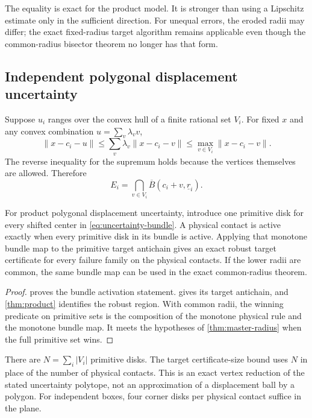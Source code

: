 The equality is exact for the product model. It is stronger than using a Lipschitz estimate only in the sufficient direction. For unequal errors, the eroded radii may differ; the exact fixed-radius target algorithm remains applicable even though the common-radius bisector theorem no longer has that form.

\subsection{Independent polygonal displacement uncertainty}
Suppose $u_i$ ranges over the convex hull of a finite rational set $V_i$. For fixed $x$ and any convex combination $u=\sum_v\lambda_v v$,
\[
\|x-c_i-u\|\le\sum_v\lambda_v\|x-c_i-v\|
\le\max_{v\in V_i}\|x-c_i-v\|.
\]
The reverse inequality for the supremum holds because the vertices themselves are allowed. Therefore
\begin{equation}\label{eq:uncertainty-bundle}
E_i=\bigcap_{v\in V_i}\overline B(c_i+v,\underline r_i).
\end{equation}

\begin{theorem}\label{thm:bundle}
For product polygonal displacement uncertainty, introduce one primitive disk for every shifted center in \cref{eq:uncertainty-bundle}. A physical contact is active exactly when every primitive disk in its bundle is active. Applying that monotone bundle map to the primitive target antichain gives an exact robust target certificate for every failure family on the physical contacts. If the lower radii are common, the same bundle map can be used in the exact common-radius theorem.
\end{theorem}
\begin{proof}
 proves the bundle activation statement.  gives its target antichain, and \cref{thm:product} identifies the robust region. With common radii, the winning predicate on primitive sets is the composition of the monotone physical rule and the monotone bundle map. It meets the hypotheses of \cref{thm:master-radius} when the full primitive set wins.
\end{proof}

There are $N=\sum_i|V_i|$ primitive disks. The target certificate-size bound uses $N$ in place of the number of physical contacts. This is an exact vertex reduction of the stated uncertainty polytope, not an approximation of a displacement ball by a polygon. For independent boxes, four corner disks per physical contact suffice in the plane.

